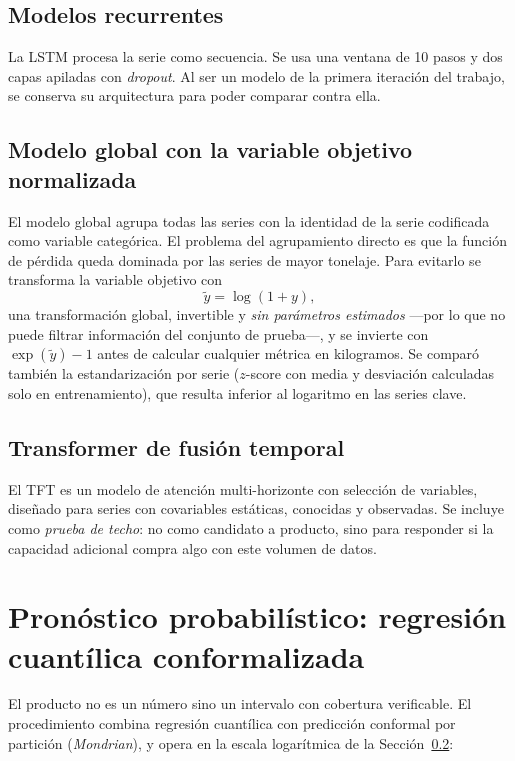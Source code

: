 \subsection{Modelos recurrentes}
La LSTM \citep{hochreiter1997,greff2017,staudemeyer2019} procesa la serie como secuencia. Se usa una ventana
de 10 pasos y dos capas apiladas con \emph{dropout}. Al ser un modelo de la primera iteración
del trabajo, se conserva su arquitectura para poder comparar contra ella.

\subsection{Modelo global con la variable objetivo normalizada}
\label{sec:met_global}
El modelo global agrupa todas las series con la identidad de la serie codificada como variable
categórica. El problema del agrupamiento directo es que la función de pérdida queda dominada
por las series de mayor tonelaje. Para evitarlo se transforma la variable objetivo con
\begin{equation}
  \tilde{y} = \log(1+y),
\end{equation}
una transformación global, invertible y \emph{sin parámetros estimados} ---por lo que no puede
filtrar información del conjunto de prueba---, y se invierte con $\exp(\tilde{y})-1$ antes de
calcular cualquier métrica en kilogramos. Se comparó también la estandarización por serie
($z$-score con media y desviación calculadas solo en entrenamiento), que resulta inferior al logaritmo en las series clave.

\subsection{Transformer de fusión temporal}
El TFT \citep{lim2021,vaswani2023} es un modelo de atención multi-horizonte con selección de
variables, diseñado para series con covariables estáticas, conocidas y observadas. Se incluye
como \emph{prueba de techo}: no como candidato a producto, sino para responder si la capacidad
adicional compra algo con este volumen de datos.

\section{Pronóstico probabilístico: regresión cuantílica conformalizada}
\label{sec:met_cqr}

El producto no es un número sino un intervalo con cobertura verificable. El procedimiento
combina regresión cuantílica con predicción conformal por partición (\emph{Mondrian}), y opera
en la escala logarítmica de la Sección~\ref{sec:met_global}:

